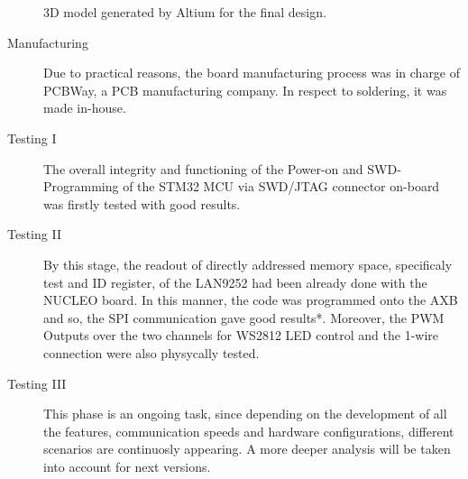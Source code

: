 \begin{figure}[ht]
    \centering
    \hfill
    \caption{3D model generated by Altium for the final design.}
    \label{fig:pcb3d}
\end{figure}


\begin{description}
\item[Manufacturing]    Due to practical reasons, the board manufacturing process was in charge of PCBWay, a PCB manufacturing company. In respect
                to soldering, it was made in-house.

\item[Testing I] The overall integrity and functioning of the Power-on and SWD-Programming of the STM32 MCU via SWD/JTAG connector on-board was firstly tested with good results. 
\end{description}

\begin{description}
\item[Testing II] By this stage, the readout of directly addressed memory space, specificaly test and ID register, of the LAN9252 had been already done
                    with the NUCLEO board. In this manner, the code was programmed onto the AXB and so, the SPI communication gave good results*. Moreover,
                    the PWM Outputs over the two channels for WS2812 LED control and the 1-wire connection were also physycally tested.  
\item[Testing III] This phase is an ongoing task, since depending on the development of all the features, communication speeds and hardware 
                configurations, different scenarios are continuosly appearing. A more deeper analysis will be taken into account for next versions.
\end{description}



